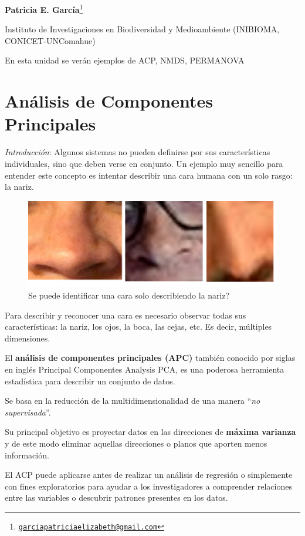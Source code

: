 \documentclass[
]{book}
\begin{document}
\textbf{Patricia E. García}\footnote{\href{mailto:garciapatriciaelizabeth@gmail.com}{\nolinkurl{garciapatriciaelizabeth@gmail.com}}}

Instituto de Investigaciones en Biodiversidad y Medioambiente (INIBIOMA, CONICET-UNComahue)

En esta unidad se verán ejemplos de ACP, NMDS, PERMANOVA

\hypertarget{anuxe1lisis-de-componentes-principales}{%
\section{Análisis de Componentes Principales}\label{anuxe1lisis-de-componentes-principales}}

\emph{Introducción}: Algunos sistemas no pueden definirse por sus características individuales, sino que deben verse en conjunto. Un ejemplo muy sencillo para entender este concepto es intentar describir una cara humana con un solo rasgo: la nariz.

\begin{figure}
\centering
\includegraphics{./images/nariz.png}
\caption{Se puede identificar una cara solo describiendo la nariz?}
\end{figure}

Para describir y reconocer una cara es necesario observar todas sus características: la nariz, los ojos, la boca, las cejas, etc. Es decir, múltiples dimensiones.

El \textbf{análisis de componentes principales (APC)} también conocido por siglas en inglés Principal Componentes Analysis PCA, es una poderosa herramienta estadística para describir un conjunto de datos.

Se basa en la reducción de la multidimensionalidad de una manera ``\emph{no supervisada}''.

Su principal objetivo es proyectar datos en las direcciones de \textbf{máxima varianza} y de este modo eliminar aquellas direcciones o planos que aporten menos información.

El ACP puede aplicarse antes de realizar un análisis de regresión o simplemente con fines exploratorios para ayudar a los investigadores a comprender relaciones entre las variables o descubrir patrones presentes en los datos.
\end{document}
